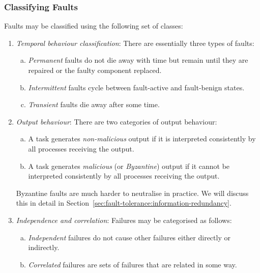 \subsubsection*{Classifying Faults}


Faults may be classified using the following set of classes:

\begin{enumerate}

 \item \emph{Temporal behaviour classification}: There are essentially three types of faults:

 \begin{enumerate}[(a)]

   \item \emph{Permanent} faults do not die away with time but
      remain until they are repaired or the faulty component replaced.

   \item \emph{Intermittent} faults cycle between fault-active and      fault-benign states.

   \item \emph{Transient} faults die away after some time.

 \end{enumerate}

  \item \emph{Output behaviour}: There are two categories of output
behaviour:

  \begin{enumerate}[(a)]

   \item A task generates \emph{non-malicious} output if it is interpreted consistently by all processes receiving the output.

   \item A task generates \emph{malicious} (or \emph{Byzantine}) output if it cannot be interpreted consistently by all processes receiving the output.

  \end{enumerate}

  Byzantine faults are much harder to neutralise in practice. We will discuss this in detail in Section~\ref{sec:fault-tolerance:information-redundancy}.

  \item \emph{Independence and correlation}: Failures may be categorised as follows:

  \begin{enumerate}[(a)]

    \item \emph{Independent} failures do not cause other failures either directly or indirectly.

    \item \emph{Correlated} failures are sets of failures that are
related in some way.

  \end{enumerate}

\end{enumerate}


